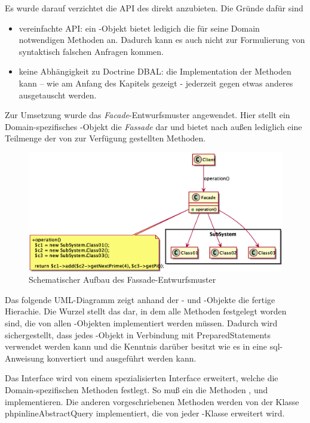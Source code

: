 Es wurde darauf verzichtet die API des  direkt anzubieten. Die Gründe dafür sind 

\begin{itemize}
\item vereinfachte API: ein -Objekt bietet ledigich die für seine Domain notwendigen Methoden an. Dadurch kann es auch nicht zur Formulierung von syntaktisch falschen Anfragen kommen.
\item keine Abhängigkeit zu Doctrine DBAL: die Implementation der Methoden kann – wie am Anfang des Kapitels gezeigt - jederzeit gegen etwas anderes ausgetauscht werden.
\end{itemize}

Zur Umsetzung wurde das \textit{Facade}-Entwurfsmuster angewendet. Hier stellt ein Domain-spezifisches -Objekt die \textit{Fassade} dar und bietet nach außen lediglich eine Teilmenge der von  zur Verfügung gestellten Methoden.

\begin{figure}[H]
    \includegraphics[scale=0.5]{gfx/uml/FacadePattern.eps}
    \caption{Schematischer Aufbau des Fassade-Entwurfsmuster}
    \label{fig:facadePattern}
\end{figure}

Das folgende UML-Diagramm zeigt anhand der - und -Objekte die fertige Hierachie. Die Wurzel stellt das  dar, in dem alle Methoden festgelegt worden sind, die von allen -Objekten implementiert werden müssen. Dadurch wird sichergestellt, dass jedes -Objekt in Verbindung mit PreparedStatements verwendet werden kann und die Kenntnis darüber besitzt wie es in eine \gls{sql}-Anweisung konvertiert und ausgeführt werden kann. 

Das Interface wird von einem spezialisierten Interface erweitert, welche die Domain-spezifischen Methoden festlegt. So muß ein  die Methoden ,  und  implementieren. Die anderen vorgeschriebenen Methoden werden von der Klasse phpinline{AbstractQuery} implementiert, die von jeder -Klasse erweitert wird.

